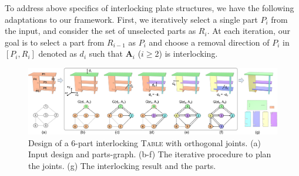 To address above specifics of interlocking plate structures, we have the following adaptations to our framework.
First, we iteratively select a single part $P_i$  from the input, and consider the set of unselected parts as $R_i$.
At each iteration, our goal is to select a part from $R_{i-1}$ as $P_i$ and choose a removal direction of $P_i$ in $[P_i, R_i]$ denoted as $d_i$ such that $\mathbf{A}_i$ ($i\geq$2) is interlocking. 
\fi




%
 

 
 \begin{figure}[!t]
 	\centering
 	\includegraphics[width=17.75cm]{images/Application_Furniture_Table.png}
 	\vspace*{-3.5mm}
 	\caption{Design of a 6-part interlocking \textsc{Table} with orthogonal joints.
 		(a) Input design and parts-graph.
 		(b-f) The iterative procedure to plan the joints.
 		(g) The interlocking result and the parts.
 	}
 	\vspace*{-2.0mm}
 	\label{fig:Application_Furniture_Table}
 \end{figure}
 
